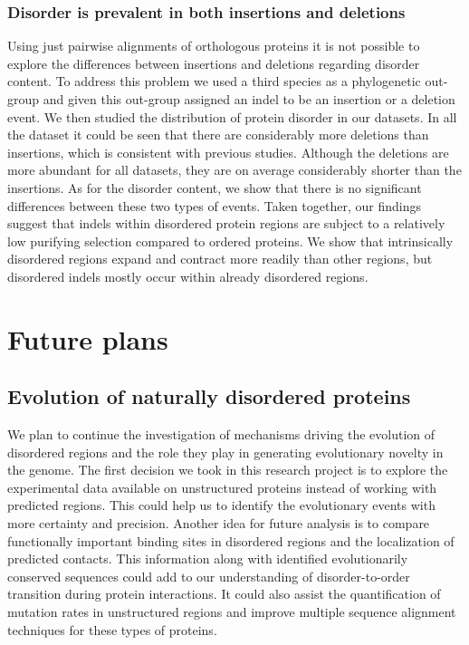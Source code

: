 \documentclass[11pt, a4paper,oneside]{report}
\newcommand{\mychapter}[2]{
    \setcounter{chapter}{#1}
    \setcounter{section}{0}
    \chapter*{#2}
    \addcontentsline{toc}{chapter}{#2}
}
\begin{document}
\subsection{Disorder is prevalent in both insertions and deletions}
Using just pairwise alignments of orthologous proteins it is not possible to explore the differences between insertions and deletions regarding disorder content. To address this problem we used a third species as a phylogenetic out-group and given this out-group assigned an indel to be an insertion or a deletion event. We then studied the distribution of protein disorder in our datasets. In all the dataset it could be seen that there are considerably more deletions than insertions, which is consistent with previous studies. Although the deletions are more abundant for all datasets, they are on average considerably shorter than the insertions. As for the disorder content, we show that there is no significant differences between these two types of events. 
Taken together, our findings suggest that indels within disordered protein regions are subject to a relatively low purifying selection compared to ordered proteins. We show that intrinsically disordered regions expand and contract more readily than other regions, but disordered indels mostly occur within already disordered regions. 

\mychapter{4}{Future plans}
\section{Evolution of naturally disordered proteins}
We plan to continue the investigation of mechanisms driving the evolution of disordered regions and the role they play in generating evolutionary novelty in the genome. The first decision we took in this research project is to explore the experimental data available on unstructured proteins instead of working with predicted regions. This could help us to identify the evolutionary events with more certainty and precision. Another idea for future analysis is to compare functionally important binding sites in disordered regions and the localization of predicted contacts. This information along with identified evolutionarily conserved sequences could add to our understanding of disorder-to-order transition during protein interactions. It could also assist the quantification of mutation rates in unstructured regions and improve multiple sequence alignment techniques for these types of proteins.  
\end{document}
